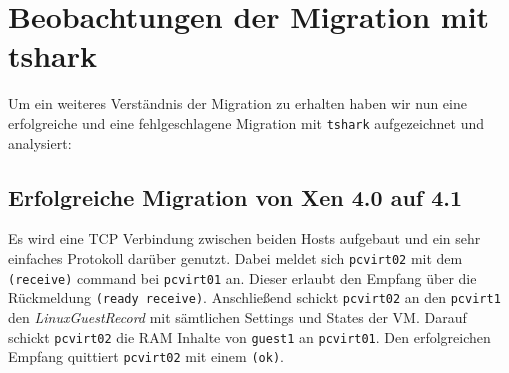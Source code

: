 \section{Beobachtungen der Migration mit tshark}
Um ein weiteres Verständnis der Migration zu erhalten haben wir nun eine erfolgreiche und eine fehlgeschlagene Migration mit \verb#tshark# aufgezeichnet und analysiert:

\subsection{Erfolgreiche Migration von Xen 4.0 auf 4.1}
Es wird eine TCP Verbindung zwischen beiden Hosts aufgebaut und ein sehr einfaches Protokoll darüber genutzt. Dabei meldet sich \verb#pcvirt02# mit dem \verb|(receive)| command bei \verb#pcvirt01# an. Dieser erlaubt den Empfang über die Rückmeldung \verb|(ready receive)|. Anschließend schickt \verb#pcvirt02# an den \verb#pcvirt1# den \emph{LinuxGuestRecord} mit sämtlichen Settings und States der VM. Darauf schickt \verb#pcvirt02# die RAM Inhalte von \verb#guest1# an \verb#pcvirt01#. Den erfolgreichen Empfang quittiert \verb#pcvirt02# mit einem \verb|(ok)|.

